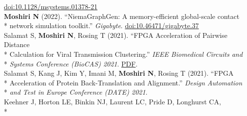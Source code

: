 \documentclass[margin,line]{res}
\begin{document}
\begin{resume}
\hspace*{8mm} \href{https://doi.org/10.1128/msystems.01378-21}{doi:10.1128/msystems.01378-21}\\
\hspace*{4mm} \textbf{Moshiri N} (2022). ``NiemaGraphGen: A memory-efficient global-scale contact\\*\vspace{2mm}
\hspace*{8mm} network simulation toolkit.'' \textit{Gigabyte}. \href{https://doi.org/10.46471/gigabyte.37}{doi:10.46471/gigabyte.37}\\
\hspace*{4mm} Salamat S, \textbf{Moshiri N}, Rosing T (2021). ``FPGA Acceleration of Pairwise Distance\\*
\hspace*{9mm} Calculation for Viral Transmission Clustering.'' \textit{IEEE Biomedical Circuits and}\\*\vspace{2mm}
\hspace*{8mm} \textit{Systems Conference (BioCAS) 2021}. \href{https://par.nsf.gov/servlets/purl/10323850}{PDF}.\\
\hspace*{4mm} Salamat S, Kang J, Kim Y, Imani M, \textbf{Moshiri N}, Rosing T (2021). ``FPGA\\*
\hspace*{9mm} Acceleration of Protein Back-Translation and Alignment.'' \textit{Design Automation}\\*\vspace{2mm}
\hspace*{8mm} \textit{and Test in Europe Conference (DATE) 2021}.\\
\hspace*{4mm} Keehner J, Horton LE, Binkin NJ, Laurent LC, Pride D, Longhurst CA,\\*

\end{resume}
\end{document}

